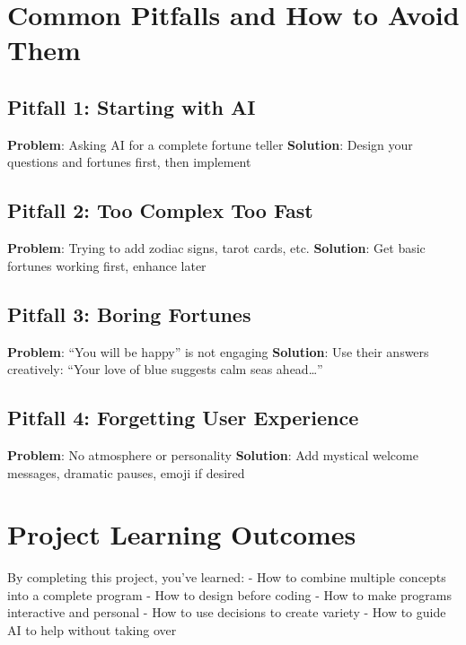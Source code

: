 \documentclass[
  letterpaper,
  DIV=11,
  numbers=noendperiod,
  oneside]{scrreprt}
\begin{document}
\section{Common Pitfalls and How to Avoid
Them}\label{common-pitfalls-and-how-to-avoid-them}

\subsection{Pitfall 1: Starting with
AI}\label{pitfall-1-starting-with-ai}

\textbf{Problem}: Asking AI for a complete fortune teller
\textbf{Solution}: Design your questions and fortunes first, then
implement

\subsection{Pitfall 2: Too Complex Too
Fast}\label{pitfall-2-too-complex-too-fast}

\textbf{Problem}: Trying to add zodiac signs, tarot cards, etc.
\textbf{Solution}: Get basic fortunes working first, enhance later

\subsection{Pitfall 3: Boring Fortunes}\label{pitfall-3-boring-fortunes}

\textbf{Problem}: ``You will be happy'' is not engaging
\textbf{Solution}: Use their answers creatively: ``Your love of blue
suggests calm seas ahead\ldots{}''

\subsection{Pitfall 4: Forgetting User
Experience}\label{pitfall-4-forgetting-user-experience}

\textbf{Problem}: No atmosphere or personality \textbf{Solution}: Add
mystical welcome messages, dramatic pauses, emoji if desired

\section{Project Learning Outcomes}\label{project-learning-outcomes}

By completing this project, you've learned: - How to combine multiple
concepts into a complete program - How to design before coding - How to
make programs interactive and personal - How to use decisions to create
variety - How to guide AI to help without taking over
\end{document}
